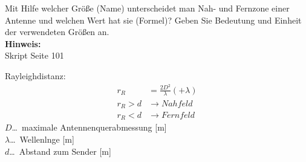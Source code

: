 \begin{question}[section=11,name={Rayleightdistanz},difficulty=,quantity=3,type=thr,tags={20151210,20130314,20061016}]
	Mit Hilfe welcher Größe (Name) unterscheidet man Nah- und Fernzone einer Antenne und welchen Wert hat sie (Formel)? Geben Sie Bedeutung und Einheit der verwendeten Größen an. 
	\\ \textbf{Hinweis:}\\
	Skript Seite 101
\end{question}
\begin{solution}
	Rayleighdistanz:
	\begin{align}
		r_R &= \frac{2D^2}{\lambda} (+\lambda)\\
	r_R > d &\rightarrow Nahfeld\\
	r_R < d &\rightarrow Fernfeld
\end{align}
	$D$\dots\ maximale Antennenquerabmessung [m]\\
	$\lambda$\dots\ Wellenlnge [m]\\
	$d$\dots\ Abstand zum Sender [m]
\end{solution}

